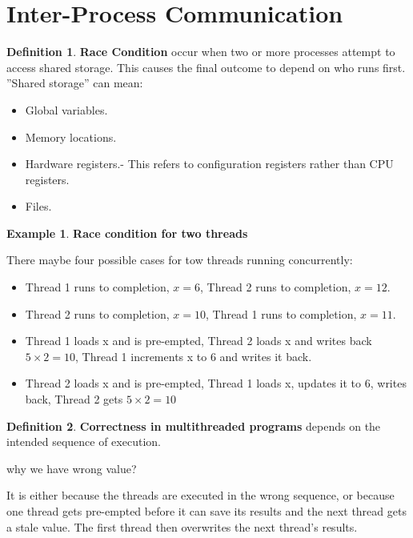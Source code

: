 \documentclass[12pt,a4paper]{article}
\theoremstyle{definition}
\newtheorem{definition}{Definition}[section]
\newtheorem{example}{Example}[section]
\newenvironment{myitemize}
{ \begin{itemize}
    \setlength{\itemsep}{5pt}
    \setlength{\parskip}{0pt}
    \setlength{\parsep}{0pt}     }
{ \end{itemize}                  }
\begin{document}
\section{Inter-Process Communication}
\begin{definition}{\textbf{Race Condition}}
	occur when two or more processes attempt to access shared storage. This causes the final outcome to depend on who runs first. ''Shared storage'' can mean:
	\begin{myitemize}
		\item Global variables.
		\item Memory locations.
		\item Hardware registers.- This refers to configuration registers rather than CPU registers.
		\item Files.
	\end{myitemize}
\end{definition}

\begin{example}{\textbf{Race condition for two threads}}
	
	There maybe four possible cases for tow threads running concurrently:
	\begin{myitemize}
		\item Thread 1 runs to completion, $x=6$, Thread 2 runs to completion, $x = 12$.
		\item Thread 2 runs to completion, $x = 10$, Thread 1 runs to completion, $x = 11$.
		\item Thread 1 loads x and is pre-empted, Thread 2 loads x and writes back $5 \times 2 = 10$, Thread 1 increments x to 6 and writes it back.
		\item Thread  2 loads x and is pre-empted, Thread 1 loads x, updates it to 6, writes back, Thread 2 gets $5 \times 2 = 10$
	\end{myitemize}
\end{example}

\begin{definition}{\textbf{Correctness in multithreaded programs}}
	depends on the intended sequence of execution.
\end{definition}

\begin{tcolorbox}

\textsf{why we have wrong value?}
	
	It is either because the threads are executed in the wrong sequence, or because one thread gets pre-empted before it can save its results and the next thread gets a stale value. The first thread then overwrites the next thread’s results.
\end{tcolorbox}
\end{document}
